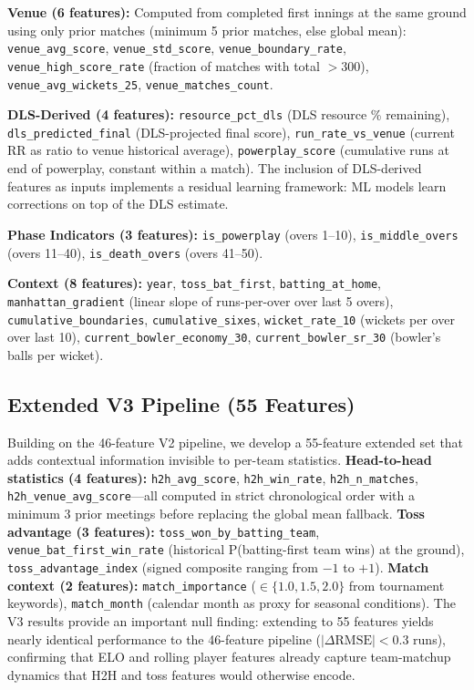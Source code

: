 \documentclass[10pt,a4paper,twocolumn]{article}
\begin{document}
\textbf{Venue (6 features):} Computed from completed first innings at the same ground using only prior matches (minimum 5 prior matches, else global mean): \texttt{venue\_avg\_score}, \texttt{venue\_std\_score}, \texttt{venue\_boundary\_rate}, \texttt{venue\_high\_score\_rate} (fraction of matches with total $>300$), \texttt{venue\_avg\_wickets\_25}, \texttt{venue\_matches\_count}.

\textbf{DLS-Derived (4 features):} \texttt{resource\_pct\_dls} (DLS resource \% remaining), \texttt{dls\_predicted\_final} (DLS-projected final score), \texttt{run\_rate\_vs\_venue} (current RR as ratio to venue historical average), \texttt{powerplay\_score} (cumulative runs at end of powerplay, constant within a match). The inclusion of DLS-derived features as inputs implements a residual learning framework: ML models learn corrections on top of the DLS estimate.

\textbf{Phase Indicators (3 features):} \texttt{is\_powerplay} (overs 1--10), \texttt{is\_middle\_overs} (overs 11--40), \texttt{is\_death\_overs} (overs 41--50).

\textbf{Context (8 features):} \texttt{year}, \texttt{toss\_bat\_first}, \texttt{batting\_at\_home}, \texttt{manhattan\_gradient} (linear slope of runs-per-over over last 5 overs), \texttt{cumulative\_boundaries}, \texttt{cumulative\_sixes}, \texttt{wicket\_rate\_10} (wickets per over over last 10), \texttt{current\_bowler\_economy\_30}, \texttt{current\_bowler\_sr\_30} (bowler's balls per wicket).

\subsection{Extended V3 Pipeline (55 Features)}

Building on the 46-feature V2 pipeline, we develop a 55-feature extended set that adds contextual information invisible to per-team statistics. \textbf{Head-to-head statistics (4 features):} \texttt{h2h\_avg\_score}, \texttt{h2h\_win\_rate}, \texttt{h2h\_n\_matches}, \texttt{h2h\_venue\_avg\_score}---all computed in strict chronological order with a minimum 3 prior meetings before replacing the global mean fallback. \textbf{Toss advantage (3 features):} \texttt{toss\_won\_by\_batting\_team}, \texttt{venue\_bat\_first\_win\_rate} (historical P(batting-first team wins) at the ground), \texttt{toss\_advantage\_index} (signed composite ranging from $-1$ to $+1$). \textbf{Match context (2 features):} \texttt{match\_importance} ($\in \{1.0, 1.5, 2.0\}$ from tournament keywords), \texttt{match\_month} (calendar month as proxy for seasonal conditions). The V3 results provide an important null finding: extending to 55 features yields nearly identical performance to the 46-feature pipeline ($|\Delta\text{RMSE}| < 0.3$ runs), confirming that ELO and rolling player features already capture team-matchup dynamics that H2H and toss features would otherwise encode.
\end{document}
